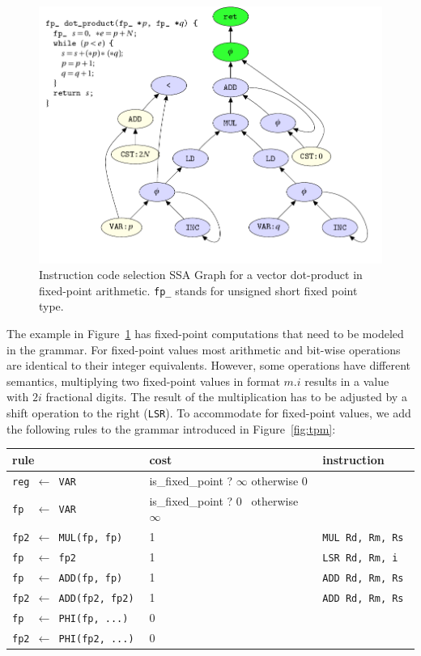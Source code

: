 \begin{figure}[bh]
  \begin{center}
   \includegraphics[width=1.03\textwidth]{pgf-fig003}
  \end{center}
  \caption{Instruction code selection SSA Graph for a vector dot-product in
    fixed-point arithmetic.  \texttt{fp\_} stands for unsigned short fixed point type. }\label{fig:ssa_graph}
\end{figure}

The example in Figure~\ref{fig:ssa_graph} has fixed-point computations
that need to be modeled in the grammar. For fixed-point values most
arithmetic and bit-wise operations are identical to their integer
equivalents. However, some operations have different semantics, \eg
multiplying two fixed-point values in format $m.i$ results in a value
with $2i$ fractional digits. The result of the multiplication has to
be adjusted by a shift operation to the right (\texttt{LSR}). To accommodate for
fixed-point values, we add the following rules to the grammar
introduced in Figure~\ref{fig:tpm}:
\begin{center}
\begin{tabular}{l|l|l}
  rule & cost & instruction\\ \hline
   \tt reg $\gets$ VAR & is\_fixed\_point ? \(\infty\) otherwise 0\\
   \tt fp \ $\gets$ VAR & is\_fixed\_point ? 0 \ otherwise  \(\infty\)  \\
  \tt  fp2 $\gets$ MUL(fp, fp)   & 1 & \tt   MUL Rd, Rm, Rs \\
  \tt  fp \ $\gets$ fp2           & 1 &\tt   LSR Rd, Rm, i  \\
  \tt  fp \ $\gets$ ADD(fp, fp)   & 1 & \tt   ADD Rd, Rm, Rs \\
  \tt  fp2 $\gets$ ADD(fp2, fp2) & 1 & \tt   ADD Rd, Rm, Rs \\
  \tt  fp \ $\gets$ PHI(fp, ...) & 0 \\
  \tt  fp2 $\gets$ PHI(fp2, ...) & 0 \\
\end{tabular}
\end{center}

